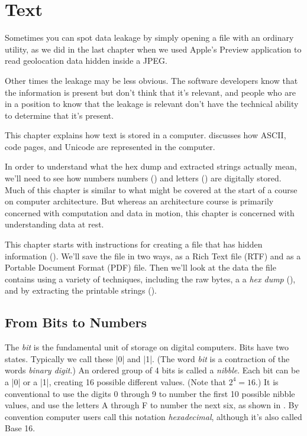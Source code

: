\chapter{Text\INDEV}

Sometimes you can spot data leakage by simply opening a file with an
ordinary utility, as we did in the last chapter when we used Apple's
Preview application to read geolocation data hidden inside a JPEG. 

Other times the leakage may be less obvious.  The software developers
know that the information is present but don't think that it's
relevant, and people who are in a position to know that the leakage is
relevant don't have the technical ability to determine that it's
present.

This chapter explains how text is stored in a
computer.  discusses
how ASCII, code pages, and Unicode are represented in the computer. 

In order to understand what the hex dump and extracted strings
actually mean, we'll need to see how numbers 
numbers () and letters () are 
digitally stored.  Much of this chapter is similar to
what might be covered at the start of a course on computer
architecture. But whereas an architecture course is primarily
concerned with computation and data in motion, this chapter is
concerned with understanding data at rest.

This chapter starts with instructions for creating a file that has hidden information
(). We'll save the file in two ways, as a Rich
Text file (RTF) and as a Portable Document Format (PDF) file. Then
we'll look at the data the file contains using a variety of
techniques, including the raw bytes, a a \emph{hex dump}
(), and by extracting the printable strings
(). 


\section{From Bits to Numbers}\label{sec:numbers}
The \emph{bit} is the fundamental unit of storage on digital computers. Bits
have two states. Typically we call these |0| and |1|. (The word
\emph{bit} is a contraction of the words \emph{binary digit}.) 
An ordered group of 4 bits is called a \emph{nibble}. Each bit can be
a |0| or a |1|, creating 16 possible different values. (Note
that $2^4=16$.) It is conventional to use the digits 0 through 9 to
number the first 10 possible nibble values, and use the letters A
through F to number the next six, as shown in . By
convention computer users call this notation \emph{hexadecimal},
although it's also called Base 16.

